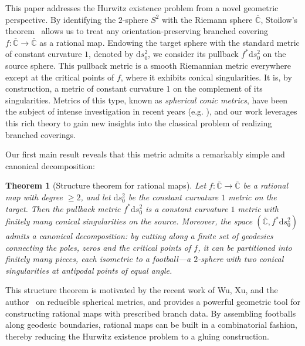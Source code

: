 \documentclass[microtype]{gtpart}     %
\newtheorem{theorem}{Theorem}[section]    %
\theoremstyle{definition}
\begin{document}
This paper addresses the Hurwitz existence problem from a novel geometric perspective. By identifying the $2$-sphere $S^2$ with the Riemann sphere $\overline{\mathbb{C}}$, Stoilow's theorem~\cite{RP19,S28} allows us to treat any orientation-preserving branched covering $f: \overline{\mathbb{C}} \to \overline{\mathbb{C}}$ as a rational map. Endowing the target sphere with the standard metric of constant curvature $1$, denoted by $\mathrm{d}s_0^2$, we consider its pullback $f^*\mathrm{d}s_0^2$ on the source sphere. This pullback metric is a smooth Riemannian metric everywhere except at the critical points of $f$, where it exhibits conical singularities. It is, by construction, a metric of constant curvature $1$ on the complement of its singularities. Metrics of this type, known as \emph{spherical conic metrics}, have been the subject of intense investigation in recent years (e.g. \cite{BD13,DFA11,Chen15,Er21,Er23,Hei62,LT92,MZ20,MZ22,McO88,MD16,MD19,EP05,HP98,Tr89,Tr91,WZ00,WWX26}), and our work leverages this rich theory to gain new insights into the classical problem of realizing branched coverings.

Our first main result reveals that this metric admits a remarkably simple and canonical decomposition:

\begin{theorem}[Structure theorem for rational maps]\label{Thm1}
Let $f: \overline{\mathbb{C}} \to \overline{\mathbb{C}}$ be a rational map with degree $\geq 2$, and let $\mathrm{d}s_0^2$ be the constant curvature $1$ metric on the target. Then the pullback metric $f^*\mathrm{d}s_0^2$ is a constant curvature $1$ metric with finitely many conical singularities on the source. Moreover, the space $(\overline{\mathbb{C}}, f^*\mathrm{d}s_0^2)$ admits a canonical decomposition: by cutting along a finite set of geodesics connecting the poles, zeros and the critical points of $f$, it can be partitioned into finitely many pieces, each isometric to a \emph{football}---a $2$-sphere with two conical singularities at antipodal points of equal angle.
\end{theorem}



This structure theorem is motivated by the recent work of Wu, Xu, and the author~\cite{WWX26} on reducible spherical metrics, and provides a powerful geometric tool for constructing rational maps with prescribed branch data. By assembling footballs along geodesic boundaries, rational maps can be built in a combinatorial fashion, thereby reducing the Hurwitz existence problem to a gluing construction.
\end{document}
